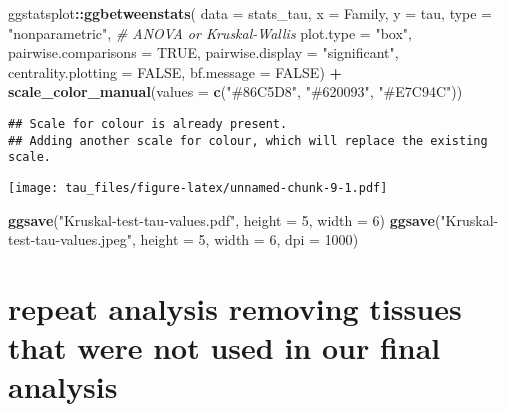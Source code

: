 \documentclass[
]{article}
\newenvironment{Shaded}{\begin{snugshade}}{\end{snugshade}}
\newcommand{\AttributeTok}[1]{\textcolor[rgb]{0.13,0.29,0.53}{#1}}
\newcommand{\CommentTok}[1]{\textcolor[rgb]{0.56,0.35,0.01}{\textit{#1}}}
\newcommand{\ConstantTok}[1]{\textcolor[rgb]{0.56,0.35,0.01}{#1}}
\newcommand{\DecValTok}[1]{\textcolor[rgb]{0.00,0.00,0.81}{#1}}
\newcommand{\FunctionTok}[1]{\textcolor[rgb]{0.13,0.29,0.53}{\textbf{#1}}}
\newcommand{\NormalTok}[1]{#1}
\newcommand{\SpecialCharTok}[1]{\textcolor[rgb]{0.81,0.36,0.00}{\textbf{#1}}}
\newcommand{\StringTok}[1]{\textcolor[rgb]{0.31,0.60,0.02}{#1}}
\begin{document}
\begin{Shaded}
\begin{Highlighting}[]
\NormalTok{ggstatsplot}\SpecialCharTok{::}\FunctionTok{ggbetweenstats}\NormalTok{(}
  \AttributeTok{data =}\NormalTok{ stats\_tau,}
  \AttributeTok{x =}\NormalTok{ Family,}
  \AttributeTok{y =}\NormalTok{ tau,}
  \AttributeTok{type =} \StringTok{"nonparametric"}\NormalTok{, }\CommentTok{\# ANOVA or Kruskal{-}Wallis}
  \AttributeTok{plot.type =} \StringTok{"box"}\NormalTok{,}
  \AttributeTok{pairwise.comparisons =} \ConstantTok{TRUE}\NormalTok{,}
  \AttributeTok{pairwise.display =} \StringTok{"significant"}\NormalTok{,}
  \AttributeTok{centrality.plotting =} \ConstantTok{FALSE}\NormalTok{,}
  \AttributeTok{bf.message =} \ConstantTok{FALSE}\NormalTok{) }\SpecialCharTok{+}
  \FunctionTok{scale\_color\_manual}\NormalTok{(}\AttributeTok{values =} 
                      \FunctionTok{c}\NormalTok{(}\StringTok{"\#86C5D8"}\NormalTok{, }\StringTok{"\#620093"}\NormalTok{, }\StringTok{"\#E7C94C"}\NormalTok{))}
\end{Highlighting}
\end{Shaded}

\begin{verbatim}
## Scale for colour is already present.
## Adding another scale for colour, which will replace the existing scale.
\end{verbatim}

\texttt{[image: tau\_files/figure-latex/unnamed-chunk-9-1.pdf]}

\begin{Shaded}
\begin{Highlighting}[]
\FunctionTok{ggsave}\NormalTok{(}\StringTok{"Kruskal{-}test{-}tau{-}values.pdf"}\NormalTok{, }\AttributeTok{height =} \DecValTok{5}\NormalTok{, }\AttributeTok{width =} \DecValTok{6}\NormalTok{)}
\FunctionTok{ggsave}\NormalTok{(}\StringTok{"Kruskal{-}test{-}tau{-}values.jpeg"}\NormalTok{, }\AttributeTok{height =} \DecValTok{5}\NormalTok{, }\AttributeTok{width =} \DecValTok{6}\NormalTok{, }\AttributeTok{dpi =} \DecValTok{1000}\NormalTok{)}
\end{Highlighting}
\end{Shaded}

\hypertarget{repeat-analysis-removing-tissues-that-were-not-used-in-our-final-analysis}{%
\section{repeat analysis removing tissues that were not used in our
final
analysis}\label{repeat-analysis-removing-tissues-that-were-not-used-in-our-final-analysis}}
\end{document}
